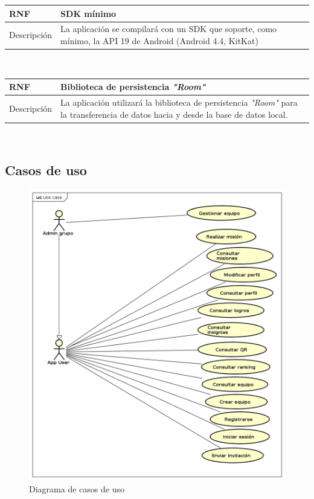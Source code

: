 \documentclass[twoside]{report}
\newcommand\addrow[2]{#1 &#2\\ }
\newcommand\addheading[2]{#1 &#2\\ \hline}
\newcommand\tabularhead{\begin{tabular}{lp{0.7\textwidth}}
\hline
}
\newenvironment{req}{\tabularhead}
{\hline\end{tabular}}
\begin{document}
\begin{req}
	\addheading{\textbf{RNF\arabic{nonFunctionalRequirements}}}{SDK mínimo}
	\addrow{Descripción}{La aplicación se compilará con un SDK que soporte, como mínimo, la API 19 de Android (Android 4.4, KitKat)\cite{androidversiondist}}
\end{req}\\

\begin{req}
	\addheading{\textbf{RNF\arabic{nonFunctionalRequirements}}}{Biblioteca de persistencia \textit{"Room"}}
	\addrow{Descripción}{La aplicación utilizará la biblioteca de persistencia \textit{"Room"} para la transferencia de datos hacia y desde la base de datos local.}
\end{req}\\

\subsection{Casos de uso}

\begin{figure}[H]
\begin{center}
\includegraphics[scale=0.5]{images/usecase.png}
\caption{Diagrama de casos de uso}
\end{center}
\end{figure}
\end{document}
